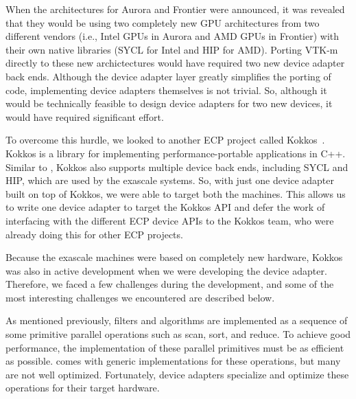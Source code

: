 When the architectures for Aurora and Frontier were announced, it was revealed that they would be using two completely new GPU architectures from two different vendors (i.e., Intel GPUs in Aurora and AMD GPUs in Frontier) with their own native libraries (SYCL for Intel and HIP for AMD).
Porting VTK-m directly to these new archictectures would have required two new device adapter back ends.
Although the device adapter layer greatly simplifies the porting of \vtkm code, implementing device adapters themselves is not trivial.
So, although it would be technically feasible to design device adapters for two new devices, it would have required significant effort.

To overcome this hurdle, we looked to another ECP project called Kokkos~\citep{Edwards2014, Trott2022}. Kokkos is a library for implementing performance-portable applications in C++. Similar to \vtkm, Kokkos also supports multiple device back ends, including SYCL and HIP, which are used by the exascale systems. So, with just one device adapter built on top of Kokkos, we were able to target both the machines.
This allows us to write one \vtkm device adapter to target the Kokkos API and defer the work of interfacing with the different ECP device APIs to the Kokkos team, who were already doing this for other ECP projects.

Because the exascale machines were based on completely new hardware, Kokkos was also in active development when we were developing the \vtkm device adapter. Therefore, we faced a few challenges during the development, and some of the most interesting challenges we encountered are described below.

As mentioned previously, \vtkm filters and algorithms are implemented as a sequence of some primitive parallel operations such as scan, sort, and reduce.
To achieve good performance, the implementation of these parallel primitives must be as efficient as possible.
\vtkm comes with generic implementations for these operations, but many are not well optimized.
Fortunately, device adapters specialize and optimize these operations for their target hardware.

